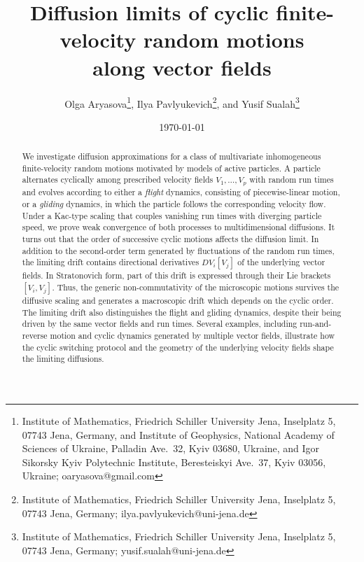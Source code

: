 \documentclass[10pt]{article}
\newcommand{\1}{1\!\!\!\;{\rm I}}
\theoremstyle{plain}
\theoremstyle{definition}
\numberwithin{equation}{section}
\begin{document}
\title{Diffusion limits of cyclic finite-velocity random motions\\ along vector fields}

\date{\today}%

\author{Olga Aryasova\footnote{Institute of Mathematics, Friedrich Schiller University Jena, Inselplatz 5,
07743 Jena, Germany,
and Institute of Geophysics, National Academy of Sciences of Ukraine, Palladin Ave.\ 32, Kyiv
03680, Ukraine, and
Igor Sikorsky Kyiv Polytechnic Institute, Beresteiskyi Ave.\ 37, Kyiv 03056, Ukraine;
oaryasova@gmail.com},
Ilya Pavlyukevich\footnote{Institute of Mathematics, Friedrich Schiller University Jena,
Inselplatz 5,
07743 Jena, Germany; ilya.pavlyukevich@uni-jena.de}, and
Yusif Sualah\footnote{Institute of Mathematics, Friedrich Schiller University Jena, Inselplatz 5,
07743 Jena, Germany; yusif.sualah@uni-jena.de}}




\maketitle


\begin{abstract}
We investigate diffusion approximations for a class of multivariate inhomogeneous finite-velocity
random motions motivated by models of active particles. A particle alternates cyclically among prescribed velocity fields
$V_1,\dots,V_p$ with random run times and evolves according to either a \emph{flight} dynamics,
consisting of piecewise-linear motion, or a \emph{gliding} dynamics, in which the particle follows the corresponding velocity flow.
Under a Kac-type scaling that couples vanishing run times with diverging particle speed,
we prove weak convergence of both processes to multidimensional diffusions.
It turns out that the order of successive cyclic motions affects the diffusion limit.
In addition to the second-order term generated by fluctuations of the random run times,
the limiting drift contains directional derivatives $DV_i[V_j]$
of the underlying vector fields. In Stratonovich form, part of this drift is expressed through their Lie brackets $[V_i,V_j]$.
Thus, the generic non-commutativity of the microscopic motions survives the diffusive scaling and generates a macroscopic drift
which depends on the cyclic order.
The limiting drift also distinguishes the flight and gliding dynamics, despite their
being driven by the same vector fields and run times.
Several examples, including run-and-reverse motion and cyclic dynamics generated by multiple vector fields,
illustrate how the cyclic switching protocol and the geometry of
the underlying velocity fields shape the limiting diffusions.
\end{abstract}
\end{document}
